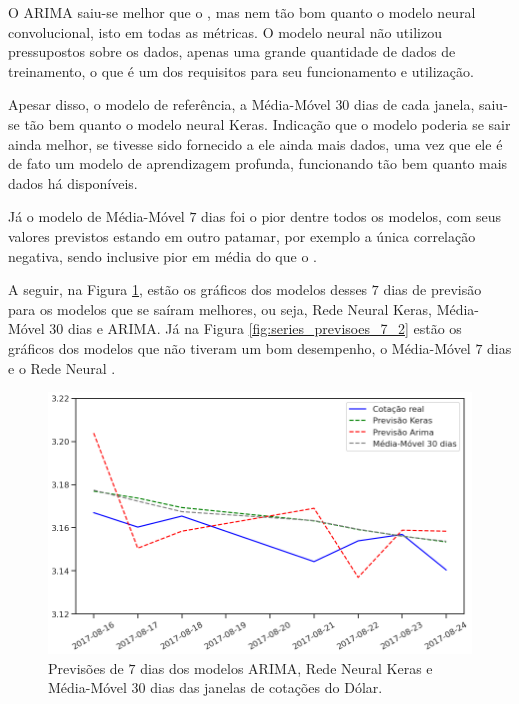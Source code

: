 O ARIMA saiu-se melhor que o , mas nem tão bom quanto o modelo neural convolucional, isto em todas as métricas. O modelo neural não utilizou pressupostos sobre os dados, apenas uma grande quantidade de dados de treinamento, o que é um dos requisitos para seu funcionamento e utilização.

Apesar disso, o modelo de referência, a Média-Móvel $30$ dias de cada janela, saiu-se tão bem quanto o modelo neural Keras. Indicação que o modelo poderia se sair ainda melhor, se tivesse sido fornecido a ele ainda mais dados, uma vez que ele é de fato um modelo de aprendizagem profunda, funcionando tão bem quanto mais dados há disponíveis.

Já o modelo de Média-Móvel $7$ dias foi o pior dentre todos os modelos, com seus valores previstos estando em outro patamar, por exemplo a única correlação negativa, sendo inclusive pior em média do que o .

A seguir, na Figura \ref{fig:series_previsoes_7_1}, estão os gráficos dos modelos desses $7$ dias de previsão para os modelos que se saíram melhores, ou seja, Rede Neural Keras, Média-Móvel $30$ dias e ARIMA. Já na Figura \ref{fig:series_previsoes_7_2} estão os gráficos dos modelos que não tiveram um bom desempenho, o Média-Móvel $7$ dias e o Rede Neural .

\begin{figure}[htb]
\centering
\includegraphics[width=14cm]{figuras/series_previsoes_7_1}
\caption{Previsões de $7$ dias dos modelos ARIMA, Rede Neural Keras e Média-Móvel $30$ dias das janelas de cotações do Dólar.}
\label{fig:series_previsoes_7_1}
\end{figure}


